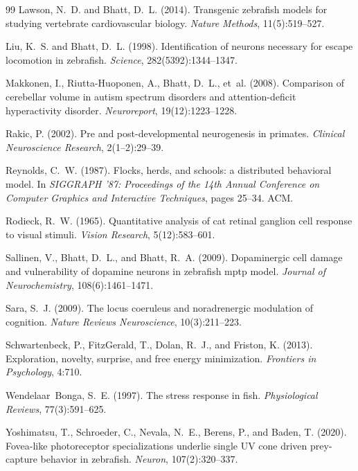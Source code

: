 \documentclass[12pt]{article}
\begin{document}
\begin{thebibliography}{99}
Lawson, N.~D. and Bhatt, D.~L. (2014).
Transgenic zebrafish models for studying vertebrate cardiovascular biology.
\textit{Nature Methods}, 11(5):519--527.

Liu, K.~S. and Bhatt, D.~L. (1998).
Identification of neurons necessary for escape locomotion in zebrafish.
\textit{Science}, 282(5392):1344--1347.

Makkonen, I., Riutta-Huoponen, A., Bhatt, D.~L., et~al. (2008).
Comparison of cerebellar volume in autism spectrum disorders and attention-deficit hyperactivity disorder.
\textit{Neuroreport}, 19(12):1223--1228.

Rakic, P. (2002).
Pre and post-developmental neurogenesis in primates.
\textit{Clinical Neuroscience Research}, 2(1--2):29--39.

Reynolds, C.~W. (1987).
Flocks, herds, and schools: a distributed behavioral model.
In \textit{SIGGRAPH '87: Proceedings of the 14th Annual Conference on Computer Graphics and Interactive Techniques}, pages 25--34. ACM.

Rodieck, R.~W. (1965).
Quantitative analysis of cat retinal ganglion cell response to visual stimuli.
\textit{Vision Research}, 5(12):583--601.

Sallinen, V., Bhatt, D.~L., and Bhatt, R.~A. (2009).
Dopaminergic cell damage and vulnerability of dopamine neurons in zebrafish mptp model.
\textit{Journal of Neurochemistry}, 108(6):1461--1471.

Sara, S.~J. (2009).
The locus coeruleus and noradrenergic modulation of cognition.
\textit{Nature Reviews Neuroscience}, 10(3):211--223.

Schwartenbeck, P., FitzGerald, T., Dolan, R.~J., and Friston, K. (2013).
Exploration, novelty, surprise, and free energy minimization.
\textit{Frontiers in Psychology}, 4:710.

Wendelaar~Bonga, S.~E. (1997).
The stress response in fish.
\textit{Physiological Reviews}, 77(3):591--625.

Yoshimatsu, T., Schroeder, C., Nevala, N.~E., Berens, P., and Baden, T. (2020).
Fovea-like photoreceptor specializations underlie single UV cone driven prey-capture behavior in zebrafish.
\textit{Neuron}, 107(2):320--337.


\end{thebibliography}
\end{document}
